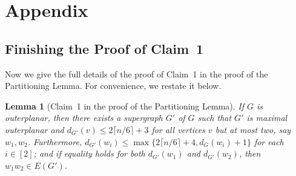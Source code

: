 \documentclass[11pt]{article}
\newtheorem{lem}{Lemma}
\theoremstyle{definition}
\newcommand\ceil[1]{\lceil#1\rceil}
\renewcommand\le\leqslant
\begin{document}
\section*{Appendix}
\subsection*{Finishing the Proof of Claim~1}

Now we give the full details of the proof of Claim~1 in the proof of the Partitioning Lemma.  For convenience, we restate it below.

\begin{lem}[Claim~1 in the proof of the Partitioning Lemma]
	If $G$ is outerplanar, then there exists a supergraph $G'$ of $G$ such that 
	$G'$ is maximal outerplanar and $d_{G'}(v)\le 2\lceil n/6\rceil+3$ for all vertices $v$ but at most two, say $w_1,w_2$.  Furthermore, $d_{G'}(w_i)\le \max\{2\ceil{n/6}+4,d_G(w_i)+1\}$ for each $i\in[2]$; and if equality holds for both $d_{G'}(w_1)$ and $d_{G'}(w_2)$, then $w_1w_2\in E(G')$.
\end{lem}
\end{document}

